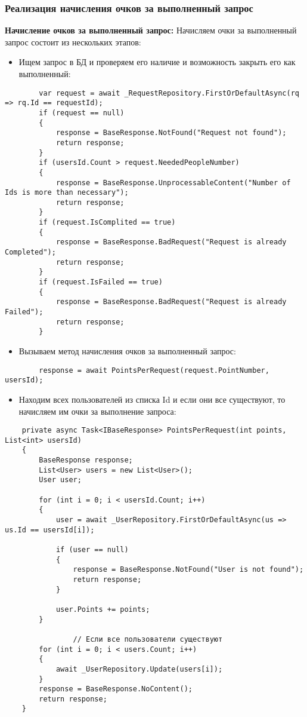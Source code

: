 \subsubsection{Реализация начисления очков за выполненный запрос}

\textbf{Начисление очков за выполненный запрос:} Начисляем очки за выполненный запрос состоит из нескольких этапов:

\begin{itemize}
	\item{Ищем запрос в БД и проверяем его наличие и возможность закрыть его как выполненный:}
\end{itemize}
\begin{verbatim}
        var request = await _RequestRepository.FirstOrDefaultAsync(rq => rq.Id == requestId);
        if (request == null)
        {
            response = BaseResponse.NotFound("Request not found");
            return response;
        }
        if (usersId.Count > request.NeededPeopleNumber)
        {
            response = BaseResponse.UnprocessableContent("Number of Ids is more than necessary");
            return response;
        }
        if (request.IsComplited == true)
        {
            response = BaseResponse.BadRequest("Request is already Completed");
            return response;
        }
        if (request.IsFailed == true)
        {
            response = BaseResponse.BadRequest("Request is already Failed");
            return response;
        }
\end{verbatim}
\begin{itemize}
	\item{Вызываем метод начисления очков за выполненный запрос:}
\end{itemize}
\begin{verbatim}
        response = await PointsPerRequest(request.PointNumber, usersId);
\end{verbatim}

\begin{itemize}
	\item{Находим всех пользователей из списка Id и если они все существуют, то начисляем им очки за выполнение запроса:}
\end{itemize}
\begin{verbatim}
    private async Task<IBaseResponse> PointsPerRequest(int points, List<int> usersId)
    {
        BaseResponse response;
        List<User> users = new List<User>();
        User user;

        for (int i = 0; i < usersId.Count; i++)
        {
            user = await _UserRepository.FirstOrDefaultAsync(us => us.Id == usersId[i]);

            if (user == null)
            {
                response = BaseResponse.NotFound("User is not found");
                return response;
            }

            user.Points += points;
        }

				// Если все пользователи существуют
        for (int i = 0; i < users.Count; i++)
        {
            await _UserRepository.Update(users[i]);
        }
        response = BaseResponse.NoContent();
        return response;
    }
\end{verbatim}

